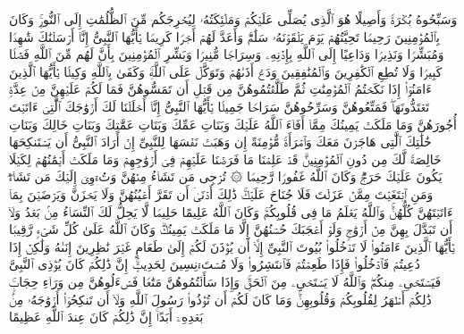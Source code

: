 \stopbuffer
\startbuffer[\q:33:42]
وَسَبِّحُوهُ بُكۡرَةࣰ وَأَصِیلًا%
\stopbuffer
\startbuffer[\q:33:43]
هُوَ ٱلَّذِی یُصَلِّی عَلَیۡكُمۡ وَمَلَٰۤئِكَتُهُۥ لِیُخۡرِجَكُم مِّنَ ٱلظُّلُمَٰتِ إِلَى ٱلنُّورِۚ وَكَانَ بِٱلۡمُؤۡمِنِینَ رَحِیمࣰا%
\stopbuffer
\startbuffer[\q:33:44]
تَحِیَّتُهُمۡ یَوۡمَ یَلۡقَوۡنَهُۥ سَلَٰمࣱۚ وَأَعَدَّ لَهُمۡ أَجۡرࣰا كَرِیمࣰا%
\stopbuffer
\startbuffer[\q:33:45]
یَٰۤأَیُّهَا ٱلنَّبِیُّ إِنَّاۤ أَرۡسَلۡنَٰكَ شَٰهِدࣰا وَمُبَشِّرࣰا وَنَذِیرࣰا%
\stopbuffer
\startbuffer[\q:33:46]
وَدَاعِیًا إِلَى ٱللَّهِ بِإِذۡنِهِۦ وَسِرَاجࣰا مُّنِیرࣰا%
\stopbuffer
\startbuffer[\q:33:47]
وَبَشِّرِ ٱلۡمُؤۡمِنِینَ بِأَنَّ لَهُم مِّنَ ٱللَّهِ فَضۡلࣰا كَبِیرࣰا%
\stopbuffer
\startbuffer[\q:33:48]
وَلَا تُطِعِ ٱلۡكَٰفِرِینَ وَٱلۡمُنَٰفِقِینَ وَدَعۡ أَذَىٰهُمۡ وَتَوَكَّلۡ عَلَى ٱللَّهِۚ وَكَفَىٰ بِٱللَّهِ وَكِیلࣰا%
\stopbuffer
\startbuffer[\q:33:49]
یَٰۤأَیُّهَا ٱلَّذِینَ ءَامَنُوۤا۟ إِذَا نَكَحۡتُمُ ٱلۡمُؤۡمِنَٰتِ ثُمَّ طَلَّقۡتُمُوهُنَّ مِن قَبۡلِ أَن تَمَسُّوهُنَّ فَمَا لَكُمۡ عَلَیۡهِنَّ مِنۡ عِدَّةࣲ تَعۡتَدُّونَهَاۖ فَمَتِّعُوهُنَّ وَسَرِّحُوهُنَّ سَرَاحࣰا جَمِیلࣰا%
\stopbuffer
\startbuffer[\q:33:50]
یَٰۤأَیُّهَا ٱلنَّبِیُّ إِنَّاۤ أَحۡلَلۡنَا لَكَ أَزۡوَٰجَكَ ٱلَّٰتِیۤ ءَاتَیۡتَ أُجُورَهُنَّ وَمَا مَلَكَتۡ یَمِینُكَ مِمَّاۤ أَفَاۤءَ ٱللَّهُ عَلَیۡكَ وَبَنَاتِ عَمِّكَ وَبَنَاتِ عَمَّٰتِكَ وَبَنَاتِ خَالِكَ وَبَنَاتِ خَٰلَٰتِكَ ٱلَّٰتِی هَاجَرۡنَ مَعَكَ وَٱمۡرَأَةࣰ مُّؤۡمِنَةً إِن وَهَبَتۡ نَفۡسَهَا لِلنَّبِیِّ إِنۡ أَرَادَ ٱلنَّبِیُّ أَن یَسۡتَنكِحَهَا خَالِصَةࣰ لَّكَ مِن دُونِ ٱلۡمُؤۡمِنِینَۗ قَدۡ عَلِمۡنَا مَا فَرَضۡنَا عَلَیۡهِمۡ فِیۤ أَزۡوَٰجِهِمۡ وَمَا مَلَكَتۡ أَیۡمَٰنُهُمۡ لِكَیۡلَا یَكُونَ عَلَیۡكَ حَرَجࣱۗ وَكَانَ ٱللَّهُ غَفُورࣰا رَّحِیمࣰا%
\stopbuffer
\startbuffer[\q:33:51]
۞ تُرۡجِی مَن تَشَاۤءُ مِنۡهُنَّ وَتُءۡوِیۤ إِلَیۡكَ مَن تَشَاۤءُۖ وَمَنِ ٱبۡتَغَیۡتَ مِمَّنۡ عَزَلۡتَ فَلَا جُنَاحَ عَلَیۡكَۚ ذَٰلِكَ أَدۡنَىٰۤ أَن تَقَرَّ أَعۡیُنُهُنَّ وَلَا یَحۡزَنَّ وَیَرۡضَیۡنَ بِمَاۤ ءَاتَیۡتَهُنَّ كُلُّهُنَّۚ وَٱللَّهُ یَعۡلَمُ مَا فِی قُلُوبِكُمۡۚ وَكَانَ ٱللَّهُ عَلِیمًا حَلِیمࣰا%
\stopbuffer
\startbuffer[\q:33:52]
لَّا یَحِلُّ لَكَ ٱلنِّسَاۤءُ مِنۢ بَعۡدُ وَلَاۤ أَن تَبَدَّلَ بِهِنَّ مِنۡ أَزۡوَٰجࣲ وَلَوۡ أَعۡجَبَكَ حُسۡنُهُنَّ إِلَّا مَا مَلَكَتۡ یَمِینُكَۗ وَكَانَ ٱللَّهُ عَلَىٰ كُلِّ شَیۡءࣲ رَّقِیبࣰا%
\stopbuffer
\startbuffer[\q:33:53]
یَٰۤأَیُّهَا ٱلَّذِینَ ءَامَنُوا۟ لَا تَدۡخُلُوا۟ بُیُوتَ ٱلنَّبِیِّ إِلَّاۤ أَن یُؤۡذَنَ لَكُمۡ إِلَىٰ طَعَامٍ غَیۡرَ نَٰظِرِینَ إِنَىٰهُ وَلَٰكِنۡ إِذَا دُعِیتُمۡ فَٱدۡخُلُوا۟ فَإِذَا طَعِمۡتُمۡ فَٱنتَشِرُوا۟ وَلَا مُسۡتَءۡنِسِینَ لِحَدِیثٍۚ إِنَّ ذَٰلِكُمۡ كَانَ یُؤۡذِی ٱلنَّبِیَّ فَیَسۡتَحۡیِۦ مِنكُمۡۖ وَٱللَّهُ لَا یَسۡتَحۡیِۦ مِنَ ٱلۡحَقِّۚ وَإِذَا سَأَلۡتُمُوهُنَّ مَتَٰعࣰا فَسۡءَلُوهُنَّ مِن وَرَاۤءِ حِجَابࣲۚ ذَٰلِكُمۡ أَطۡهَرُ لِقُلُوبِكُمۡ وَقُلُوبِهِنَّۚ وَمَا كَانَ لَكُمۡ أَن تُؤۡذُوا۟ رَسُولَ ٱللَّهِ وَلَاۤ أَن تَنكِحُوۤا۟ أَزۡوَٰجَهُۥ مِنۢ بَعۡدِهِۦۤ أَبَدًاۚ إِنَّ ذَٰلِكُمۡ كَانَ عِندَ ٱللَّهِ عَظِیمًا%
